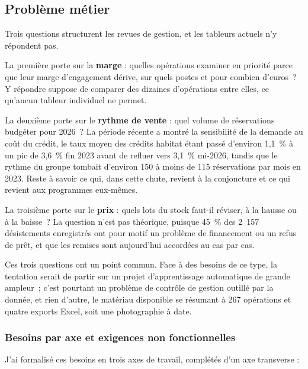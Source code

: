 \hypertarget{probluxe8me-muxe9tier}{%
\subsection{Problème métier}\label{probluxe8me-muxe9tier}}

Trois questions structurent les revues de gestion, et les tableurs actuels n'y répondent pas.

La première porte sur la \textbf{marge} : quelles opérations examiner en priorité parce que leur
marge d'engagement dérive, sur quels postes et pour combien d'euros~? Y répondre suppose de
comparer des dizaines d'opérations entre elles, ce qu'aucun tableur individuel ne permet.

La deuxième porte sur le \textbf{rythme de vente} : quel volume de réservations budgéter pour 2026~?
La période récente a montré la sensibilité de la demande au coût du crédit, le taux moyen des
crédits habitat étant passé d'environ 1,1~\% à un pic de 3,6~\% fin 2023 avant de refluer vers
3,1~\% mi-2026, tandis que le rythme du groupe tombait d'environ 150 à moins de 115
réservations par mois en 2023. Reste à savoir ce qui, dans cette chute, revient à la
conjoncture et ce qui revient aux programmes eux-mêmes.

La troisième porte sur le \textbf{prix} : quels lots du stock faut-il réviser, à la hausse ou à la
baisse~? La question n'est pas théorique, puisque 45~\% des 2~157 désistements enregistrés ont
pour motif un problème de financement ou un refus de prêt, et que les remises sont aujourd'hui
accordées au cas par cas.

Ces trois questions ont un point commun. Face à des besoins de ce type, la tentation serait de
partir sur un projet d'apprentissage automatique de grande ampleur~; c'est pourtant un problème
de contrôle de gestion outillé par la donnée, et rien d'autre, le matériau disponible se
résumant à 267 opérations et quatre exports Excel, soit une photographie à date.

\hypertarget{besoins-par-axe-et-exigences-non-fonctionnelles}{%
\subsubsection{Besoins par axe et exigences non fonctionnelles}\label{besoins-par-axe-et-exigences-non-fonctionnelles}}

J'ai formalisé ces besoins en trois axes de travail, complétés d'un axe transverse :

